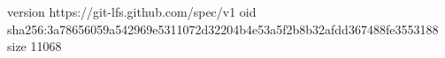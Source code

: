 version https://git-lfs.github.com/spec/v1
oid sha256:3a78656059a542969e5311072d32204b4e53a5f2b8b32afdd367488fe3553188
size 11068
